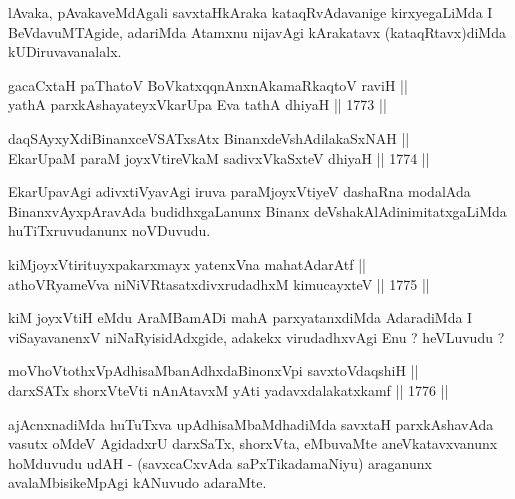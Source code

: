 \begin{artha}
lAvaka, pAvakaveMdAgali savxtaHkAraka kataqRvAdavanige kirxyegaLiMda
I BeVdavuMTAgide, adariMda Atamxnu nijavAgi kArakatavx
(kataqRtavx)diMda kUDiruvavanalalx.
\end{artha}

\begin{shl}
gacaCxtaH paThatoV BoVkatxqqnAnxnAkamaRkaqtoV raviH || \\
yathA parxkAshayateyxVkarUpa Eva tathA dhiyaH ||  1773 ||  
\end{shl}




\begin{shl}
daqSAyxyXdiBinanxceVSATxsAtx BinanxdeVshAdilakaSxNAH || \\
EkarUpaM paraM joyxVtireVkaM sadivxVkaSxteV dhiyaH ||  1774 ||  
\end{shl}

\begin{artha}
EkarUpavAgi adivxtiVyavAgi iruva paraMjoyxVtiyeV dashaRna modalAda
BinanxvAyxpAravAda budidhxgaLanunx Binanx deVshakAlAdinimitatxgaLiMda
huTiTxruvudanunx noVDuvudu.
\end{artha}

\begin{shl}
kiMjoyxVtirituyxpakarxmayx yatenxVna mahatA\s \s darAtf ||  \\
athoVR\s yameVva niNiVRtasatxdivxrudadhxM kimucayxteV ||  1775 ||  
\end{shl}

\begin{artha}
kiM joyxVtiH eMdu AraMBamADi mahA parxyatanxdiMda AdaradiMda I
viSayavanenxV niNaRyisidAdxgide, adakekx virudadhxvAgi Enu ? heVLuvudu ?
\end{artha}


\begin{shl}
moVhoVtothxVpAdhisaMbanAdhxdaBinonxV\s pi savxtoVdaqshiH || \\
darxSATx shorxVteVti nAnAtavxM yAti yadavxdalakatxkamf ||  1776 ||  
\end{shl}

\begin{artha}
ajAcnxnadiMda huTuTxva upAdhisaMbaMdhadiMda savxtaH parxkAshavAda
vasutx oMdeV AgidadxrU darxSaTx, shorxVta, eMbuvaMte aneVkatavxvanunx
hoMduvudu udAH - (savxcaCxvAda saPxTikadamaNiyu) araganunx
avalaMbisikeMpAgi kANuvudo adaraMte.
\end{artha}

